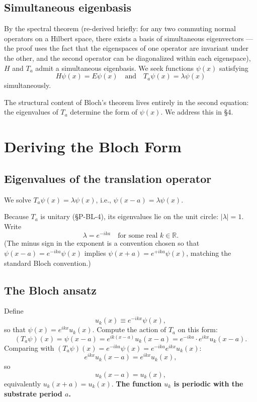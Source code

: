 \documentclass[11pt,a4paper]{article}
\begin{document}
\subsection{Simultaneous eigenbasis}

By the spectral theorem (re-derived briefly: for any two commuting normal operators on a Hilbert space, there exists a basis of simultaneous eigenvectors --- the proof uses the fact that the eigenspaces of one operator are invariant under the other, and the second operator can be diagonalized within each eigenspace), $H$ and $T_a$ admit a simultaneous eigenbasis. We seek functions $\psi(x)$ satisfying
\[
H \psi(x) = E \psi(x) \quad \text{and} \quad T_a \psi(x) = \lambda \psi(x)
\]
simultaneously.

The structural content of Bloch's theorem lives entirely in the second equation: the eigenvalues of $T_a$ determine the form of $\psi(x)$. We address this in \S4.

\section{Deriving the Bloch Form}

\subsection{Eigenvalues of the translation operator}

We solve $T_a \psi(x) = \lambda \psi(x)$, i.e., $\psi(x - a) = \lambda \psi(x)$.

Because $T_a$ is unitary (\S P-BL-4), its eigenvalues lie on the unit circle: $|\lambda| = 1$. Write
\[
\lambda = e^{-ika} \quad \text{for some real } k \in \mathbb{R}.
\]
(The minus sign in the exponent is a convention chosen so that $\psi(x - a) = e^{-ika}\psi(x)$ implies $\psi(x + a) = e^{+ika}\psi(x)$, matching the standard Bloch convention.)

\subsection{The Bloch ansatz}

Define
\[
u_k(x) \equiv e^{-ikx} \psi(x),
\]
so that $\psi(x) = e^{ikx} u_k(x)$. Compute the action of $T_a$ on this form:
\[
(T_a \psi)(x) = \psi(x - a) = e^{ik(x-a)} u_k(x - a) = e^{-ika} \cdot e^{ikx} u_k(x - a).
\]
Comparing with $(T_a\psi)(x) = e^{-ika}\psi(x) = e^{-ika} e^{ikx} u_k(x)$:
\[
e^{ikx} u_k(x - a) = e^{ikx} u_k(x),
\]
so
\[
u_k(x - a) = u_k(x),
\]
equivalently $u_k(x + a) = u_k(x)$. \textbf{The function $u_k$ is periodic with the substrate period $a$.}
\end{document}
